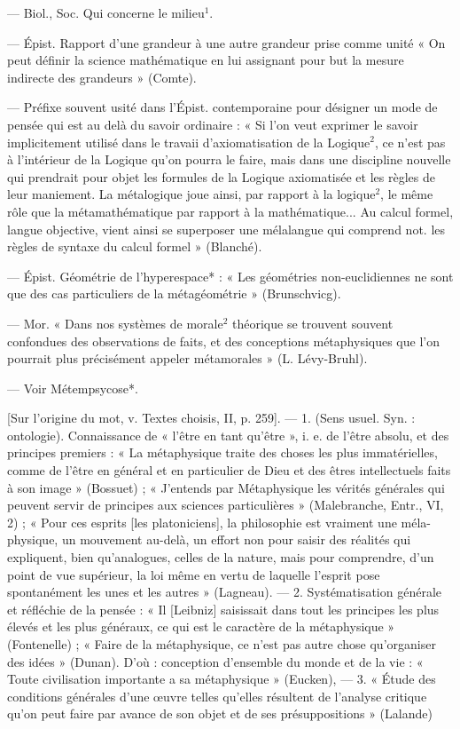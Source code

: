 \begin{itemize}[leftmargin=1cm, label=, itemsep=1pt]
 — Biol., Soc. Qui concerne le milieu$^1$.

 — Épist. Rapport d’une
grandeur à une autre grandeur
prise comme unité « On peut
définir la science mathématique en
lui assignant pour but la mesure
indirecte des grandeurs » (Comte).

 — Préfixe souvent usité dans
l'Épist. contemporaine pour désigner un mode de pensée qui est au
delà du savoir ordinaire : « Si l’on
veut exprimer le savoir implicitement utilisé dans le travaii d’axiomatisation de la Logique$^2$, ce n’est
pas à l’intérieur de la Logique qu’on
pourra le faire, mais dans une discipline nouvelle qui prendrait pour
objet les formules de la Logique
axiomatisée et les règles de leur
maniement. La métalogique joue
ainsi, par rapport à la logique$^2$, le
même rôle que la métamathématique
par rapport à la mathématique... Au
calcul formel, langue objective, vient
ainsi se superposer une mélalangue
qui comprend not. les règles de
syntaxe du calcul formel » (Blanché).

 — Épist. Géométrie
de l'hyperespace* : « Les géométries
non-euclidiennes ne sont que des
cas particuliers de la métagéométrie » (Brunschvicg).

 — Mor. « Dans nos systèmes de morale$^2$ théorique se trouvent souvent confondues des observations de faits, et des conceptions
métaphysiques que l’on pourrait
plus précisément appeler métamorales » (L. Lévy-Bruhl).

 — Voir Métempsycose*.

 [Sur l'origine du
mot, v. Textes choisis, II, p. 259]. —
1. (Sens usuel. Syn. : ontologie).
Connaissance de « l'être en tant
qu'être », i. e. de l'être absolu, et des
principes premiers : « La métaphysique traite des choses les plus
immatérielles, comme de l'être en
général et en particulier de Dieu et
des êtres intellectuels faits à son
image » (Bossuet) ; « J'entends par
Métaphysique les vérités générales
qui peuvent servir de principes aux
sciences particulières » (Malebranche,
Entr., VI, 2) ; « Pour ces esprits [les
platoniciens], la philosophie est vraiment une méla-physique, un mouvement au-delà, un effort non pour
saisir des réalités qui expliquent,
bien qu’analogues, celles de la nature, mais pour comprendre, d’un
point de vue supérieur, la loi même
en vertu de laquelle l'esprit pose
spontanément les unes et les autres »
(Lagneau). — 2. Systématisation
générale et réfléchie de la pensée :
« Il [Leibniz] saisissait dans tout les
principes les plus élevés et les plus
généraux, ce qui est le caractère de
la métaphysique » (Fontenelle) ;
« Faire de la métaphysique, ce n’est
pas autre chose qu'organiser des
idées » (Dunan). D'où : conception
d’ensemble du monde et de la vie :
« Toute civilisation importante a sa
métaphysique » (Eucken), — 3.
« Étude des conditions générales
d'une œuvre telles qu’elles résultent
de l'analyse critique qu’on peut
faire par avance de son objet et de
ses présuppositions » (Lalande)


\end{itemize}
